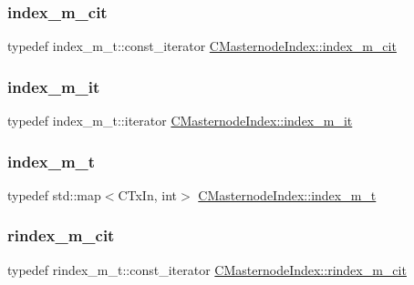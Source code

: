 \subsubsection{\texorpdfstring{index\+\_\+m\+\_\+cit}{index\_m\_cit}}
{\footnotesize\ttfamily typedef index\+\_\+m\+\_\+t\+::const\+\_\+iterator \mbox{\hyperlink{class_c_masternode_index_a012060326cfe73f675a791131b6fd91a}{C\+Masternode\+Index\+::index\+\_\+m\+\_\+cit}}}

\mbox{\label{class_c_masternode_index_a5a09121c16d5c51ab422b2d2f02a2d6b}} 
\subsubsection{\texorpdfstring{index\+\_\+m\+\_\+it}{index\_m\_it}}
{\footnotesize\ttfamily typedef index\+\_\+m\+\_\+t\+::iterator \mbox{\hyperlink{class_c_masternode_index_a5a09121c16d5c51ab422b2d2f02a2d6b}{C\+Masternode\+Index\+::index\+\_\+m\+\_\+it}}}

\mbox{\label{class_c_masternode_index_a78c666dcc663fceff46cd86f4eb1870c}} 
\subsubsection{\texorpdfstring{index\+\_\+m\+\_\+t}{index\_m\_t}}
{\footnotesize\ttfamily typedef std\+::map$<$C\+Tx\+In, int$>$ \mbox{\hyperlink{class_c_masternode_index_a78c666dcc663fceff46cd86f4eb1870c}{C\+Masternode\+Index\+::index\+\_\+m\+\_\+t}}}

\mbox{\label{class_c_masternode_index_ac24d75bd8a5832de19ba5ae8f37e9e90}} 
\subsubsection{\texorpdfstring{rindex\+\_\+m\+\_\+cit}{rindex\_m\_cit}}
{\footnotesize\ttfamily typedef rindex\+\_\+m\+\_\+t\+::const\+\_\+iterator \mbox{\hyperlink{class_c_masternode_index_ac24d75bd8a5832de19ba5ae8f37e9e90}{C\+Masternode\+Index\+::rindex\+\_\+m\+\_\+cit}}}

